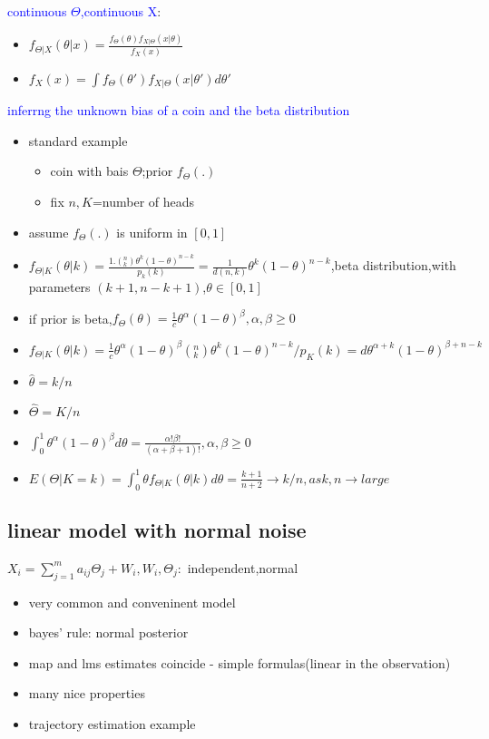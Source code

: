 \textcolor{blue}{continuous $\Theta$,continuous X}:

\begin{itemize}
    \item $f_{\Theta|X}(\theta|x)=\frac{f_{\Theta}(\theta)f_{X|\Theta}(x|\theta)}{f_X(x)}$
    \item $f_X(x)=\int f_\Theta(\theta')f_{X|\Theta}(x|\theta')d\theta'$
\end{itemize}

\textcolor{blue}{inferrng the unknown bias of a coin and the beta distribution}

\begin{itemize}
    \item standard example
    \begin{itemize}
        \item coin with bais $\Theta$;prior $f_\Theta(.)$
        \item fix $n,K$=number of heads
    \end{itemize}
    \item assume $f_\Theta(.)$ is uniform in $[0,1]$
    \item $f_{\Theta|K}(\theta|k)=\frac{1.(^n_k)\theta^k(1-\theta)^{n-k}}{p_k(k)}=\frac{1}{d(n,k)}\theta^k(1-\theta)^{n-k}$,beta distribution,with parameters $(k+1,n-k+1)$,$\theta\in[0,1]$
    \item if prior is beta,$f_\Theta(\theta)=\frac{1}{c}\theta^\alpha(1-\theta)^\beta,\alpha,\beta\ge0$
    \item $f_{\Theta|K}(\theta|k)=\frac{1}{c}\theta^\alpha(1-\theta)^\beta(^n_k)\theta^k(1-\theta)^{n-k}/p_K(k)=d\theta^{\alpha+k}(1-\theta)^{\beta+n-k}$
    \item $\hat{\theta}=k/n$
    \item $\hat{\Theta}=K/n$
    \item $\int_{0}^{1}\theta^\alpha(1-\theta)^\beta d\theta=\frac{\alpha!\beta!}{(\alpha+\beta+1)!},\alpha,\beta\ge0$
    \item $E(\Theta|K=k)=\int_{0}^{1}\theta f_{\Theta|K}(\theta|k)d\theta=\frac{k+1}{n+2}\to k/n,as k,n\to large$
\end{itemize}


\subsection*{linear model with normal noise}

$X_i=\sum_{j=1}^ma_{ij}\Theta_j+W_i,W_i,\Theta_j:$ independent,normal

\begin{itemize}
    \item very common and conveninent model
    \item bayes' rule: normal posterior
    \item map and lms estimates coincide - simple formulas(linear in the observation)
    \item many nice properties
    \item trajectory estimation example
\end{itemize}



